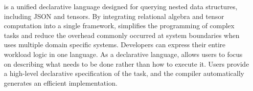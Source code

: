 \documentclass[acmsmall,nonacm]{acmart}\settopmatter{printfolios=true,printccs=false,printacmref=false}
\newcommand{\rhyme}{\text{Rhyme}\xspace}
\begin{document}

\rhyme\cite{abeysinghe2024rhyme, abeysingherhyme} is a unified declarative language designed for querying nested data structures, including JSON and tensors. By integrating relational algebra and tensor computation into a single framework, \rhyme simplifies the programming of complex tasks and reduce the overhead commonly occurred at system boundaries when uses multiple domain specific systems\cite{overhead1, overhead2}. Developers can express their entire workload logic in one language.  As a declarative language, \rhyme allows users to focus on describing what needs to be done rather than how to execute it. Users provide a high-level declarative specification of the task, and the compiler automatically generates an efficient implementation.\par
\end{document}
